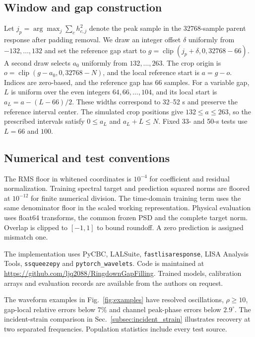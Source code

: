 \documentclass[10pt,prd,aps,a4paper,twocolumn,superscriptaddress,nofootinbib,floatfix]{revtex4-2}
\begin{document}
\subsection{Window and gap construction}\label{app:crop_rule}
Let $j_p=\arg\max_j\sum_ch_{c,j}^2$ denote the peak sample in the 32768-sample parent response after padding removal. We draw an integer offset $\delta$ uniformly from $-132,\ldots,132$ and set the reference gap start to $g=\operatorname{clip}(j_p+\delta,0,32768-66)$. A second draw selects $a_0$ uniformly from $132,\ldots,263$. The crop origin is $o=\operatorname{clip}(g-a_0,0,32768-N)$, and the local reference start is $a=g-o$. Indices are zero-based, and the reference gap has 66 samples. For a variable gap, $L$ is uniform over the even integers $64,66,\ldots,104$, and its local start is $a_L=a-(L-66)/2$. These widths correspond to 32--52 s and preserve the reference interval center. The simulated crop positions give $132\le a\le263$, so the prescribed intervals satisfy $0\le a_L$ and $a_L+L\le N$. Fixed 33- and 50-s tests use $L=66$ and $100$.

\subsection{Numerical and test conventions}
The RMS floor in whitened coordinates is $10^{-4}$ for coefficient and residual normalization. Training spectral target and prediction squared norms are floored at $10^{-12}$ for finite numerical division. The time-domain training term uses the same denominator floor in the scaled working representation. Physical evaluation uses float64 transforms, the common frozen PSD and the complete target norm. Overlap is clipped to $[-1,1]$ to bound roundoff. A zero prediction is assigned mismatch one.

The implementation uses PyCBC, LALSuite, \texttt{fastlisaresponse}, LISA Analysis Tools, \texttt{ssqueezepy} and \texttt{pytorch\_wavelets}. Code is maintained at \url{https://github.com/ljq2088/RingdownGapFilling}. Trained models, calibration arrays and evaluation records are available from the authors on request.

The waveform examples in Fig.~\ref{fig:examples} have resolved oscillations, $\rho\ge10$, gap-local relative errors below 7\% and channel peak-phase errors below $2.9^\circ$. The incident-strain comparison in Sec.~\ref{subsec:incident_strain} illustrates recovery at two separated frequencies. Population statistics include every test source.
\end{document}
